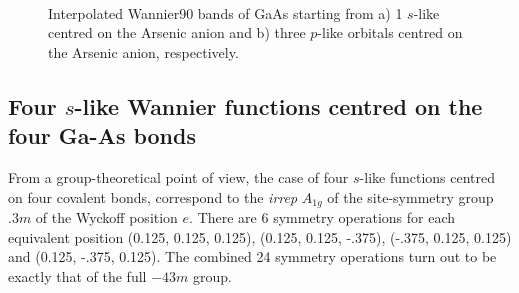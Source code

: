 	\begin{figure}[h!]
	\centering
	\\
	\centering
	\caption{Interpolated Wannier90 bands of GaAs starting from a) 1 $s$-like centred on the Arsenic anion and b) three $p$-like orbitals centred on the Arsenic anion, respectively.}
	\label{fig21.5}
	\end{figure}

\clearpage

\subsection*{Four $s$-like Wannier functions centred on the four Ga-As bonds}

From a group-theoretical point of view, the case of four $s$-like functions centred on four covalent bonds, correspond to the \textit{irrep} $A_{1g}$ of the site-symmetry group $.3m$ of the Wyckoff position $e$. There are 6 symmetry operations for each equivalent position (0.125, 0.125, 0.125), (0.125, 0.125, -.375), (-.375, 0.125, 0.125) and (0.125, -.375, 0.125). The combined 24 symmetry operations turn out to be exactly that of the full ${-}43m$ group.

